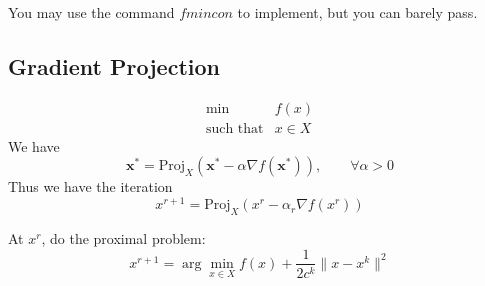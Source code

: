 You may use the command $fmincon$ to implement, but you can barely pass.

\subsection{Gradient Projection}
\[
\begin{array}{ll}
\min&f(x)\\
\mbox{such that}&x\in X
\end{array}
\]
We have
\[
\bm x^*=\mbox{Proj}_X(\bm x^*-\alpha\nabla f(\bm x^*)),\qquad\forall\alpha>0
\]
Thus we have the iteration
\[
x^{r+1} = \mbox{Proj}_X(x^r - \alpha_r\nabla f(x^r))
\]


At $x^r$, do the proximal problem:
\[
x^{r+1} = \arg\min_{x\in X}f(x)+\frac{1}{2c^k}\|x-x^k\|^2
\]









